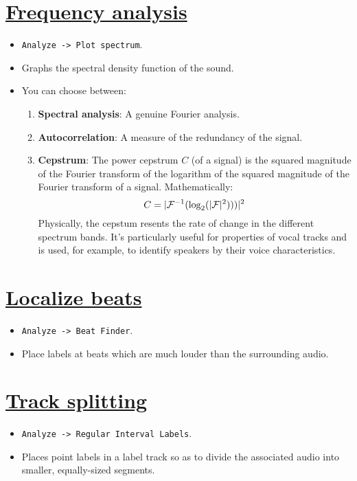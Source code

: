 \section{\href{http://manual.audacityteam.org/o/man/plot_spectrum.html}{Frequency analysis}}
\begin{itemize}
\item \verb|Analyze -> Plot spectrum|.
\item Graphs the spectral density function of the sound.
\item You can choose between:
  \begin{enumerate}
  \item \textbf{Spectral analysis}: A genuine Fourier analysis.
  \item \textbf{Autocorrelation}: A measure of the redundancy of the signal.
  \item \textbf{Cepstrum}: The power cepstrum $C$ (of a signal) is the
    squared magnitude of the Fourier transform of the logarithm of the
    squared magnitude of the Fourier transform of a
    signal. Mathematically:
    \begin{equation*}
      C=|{\cal{F}}^{-1}(\log_2(|{\cal{F}}|^2)))|^2
    \end{equation*}
    Physically, the cepstum resents the rate of change in the
    different spectrum bands. It's particularly useful for properties
    of vocal tracks and is used, for example, to identify speakers by
    their voice characteristics.
  \end{enumerate}
\end{itemize}

\section{\href{http://manual.audacityteam.org/o/man/beat_finder.html}{Localize beats}}
\begin{itemize}
\item \verb|Analyze -> Beat Finder|.
\item Place labels at beats which are much louder than the surrounding
  audio.
\end{itemize}

\section{\href{http://manual.audacityteam.org/o/man/regular_interval_labels.html}{Track splitting}}
\begin{itemize}
\item \verb|Analyze -> Regular Interval Labels|.
\item Places point labels in a label track so as to divide the
  associated audio into smaller, equally-sized segments.
\end{itemize}

